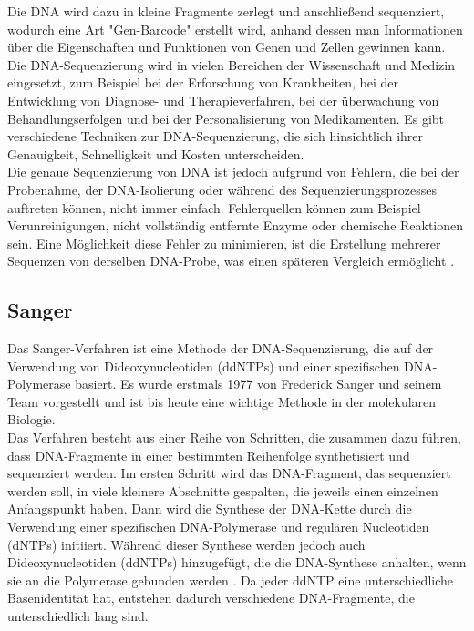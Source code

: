 \documentclass[oneside,bibliography=totocnumbered,BCOR=5mm]{scrbook}%
\theoremstyle{definition}
\theoremstyle{definition}
\theoremstyle{definition}
\theoremstyle{definition}
\theoremstyle{definition}
\theoremstyle{definition}
\begin{document}
Die DNA wird dazu in kleine Fragmente zerlegt und anschließend sequenziert, 
wodurch eine Art "Gen-Barcode" erstellt wird, anhand dessen man Informationen über die 
Eigenschaften und Funktionen von Genen und Zellen gewinnen kann. \\


Die DNA-Sequenzierung wird in vielen Bereichen der Wissenschaft und Medizin eingesetzt, 
zum Beispiel bei der Erforschung von Krankheiten, bei der Entwicklung von Diagnose- und Therapieverfahren, 
bei der überwachung von Behandlungserfolgen und bei der Personalisierung von Medikamenten. 
Es gibt verschiedene Techniken zur DNA-Sequenzierung, die sich hinsichtlich ihrer Genauigkeit, 
Schnelligkeit und Kosten unterscheiden. \\


Die genaue Sequenzierung von DNA ist jedoch aufgrund von Fehlern, die bei der Probenahme, 
der DNA-Isolierung oder während des Sequenzierungsprozesses auftreten können, 
nicht immer einfach. 
Fehlerquellen können zum Beispiel Verunreinigungen, nicht vollständig entfernte Enzyme oder chemische Reaktionen sein. 
Eine Möglichkeit diese Fehler zu minimieren, ist die Erstellung mehrerer Sequenzen von derselben DNA-Probe, 
was einen späteren Vergleich ermöglicht \autocite{dnaReplicants}. \\
\linebreak[4]


\subsection{Sanger}

Das Sanger-Verfahren ist eine Methode der DNA-Sequenzierung, 
die auf der Verwendung von Dideoxynucleotiden (ddNTPs) und einer spezifischen DNA-Polymerase basiert. 
Es wurde erstmals 1977 von Frederick Sanger und seinem Team vorgestellt und ist bis heute eine wichtige Methode 
in der molekularen Biologie. \\


Das Verfahren besteht aus einer Reihe von Schritten, die zusammen dazu führen, 
dass DNA-Fragmente in einer bestimmten Reihenfolge synthetisiert und sequenziert werden. 
Im ersten Schritt wird das DNA-Fragment, das sequenziert werden soll, in viele kleinere Abschnitte gespalten, 
die jeweils einen einzelnen Anfangspunkt haben. Dann wird die Synthese der DNA-Kette durch die Verwendung 
einer spezifischen DNA-Polymerase und regulären Nucleotiden (dNTPs) initiiert. 
Während dieser Synthese werden jedoch auch Dideoxynucleotiden (ddNTPs) hinzugefügt, die die DNA-Synthese anhalten, 
wenn sie an die Polymerase gebunden werden \autocite[Seite 2]{metzker2005}. 
Da jeder ddNTP eine unterschiedliche Basenidentität hat, entstehen dadurch verschiedene DNA-Fragmente, 
die unterschiedlich lang sind. \\
\end{document}
